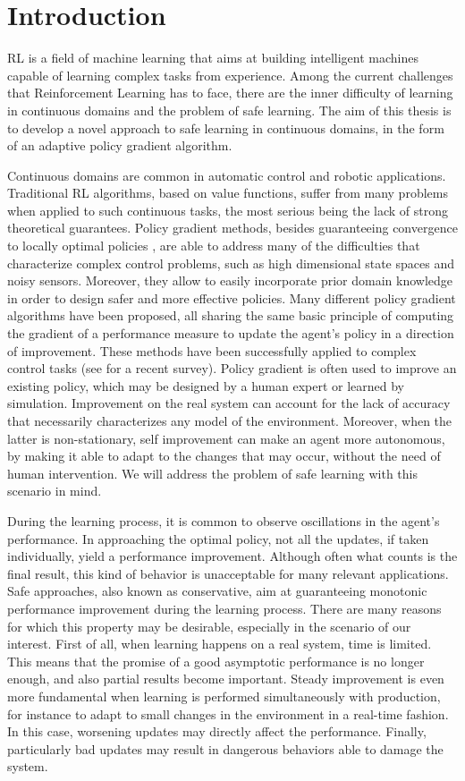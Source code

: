 \chapter{Introduction}\label{chap:intro}
\ac{RL} is a field of machine learning that aims at building intelligent machines capable of learning complex tasks from experience. Among the current challenges that Reinforcement Learning has to face, there are the inner difficulty of learning in continuous domains and the problem of safe learning. The aim of this thesis is to develop a novel approach to safe learning in continuous domains, in the form of an adaptive policy gradient algorithm.

Continuous domains are common in automatic control and robotic applications. Traditional \ac{RL} algorithms, based on value functions, suffer from many problems when applied to such continuous tasks, the most serious being the lack of strong theoretical guarantees.
Policy gradient methods, besides guaranteeing convergence to locally optimal policies \cite{Sutton1999a}, are able to address many of the difficulties that characterize complex control problems, such as high dimensional state spaces and noisy sensors. Moreover, they allow to easily incorporate prior domain knowledge in order to design safer and more effective policies.
Many different policy gradient algorithms have been proposed, all sharing the same basic principle of computing the gradient of a performance measure to update the agent's policy in a direction of improvement. These methods have been successfully applied to complex control tasks (see \cite{deisenroth2013survey} for a recent survey). 
Policy gradient is often used to improve an existing policy, which may be designed by a human expert or learned by simulation. Improvement on the real system can account for the lack of accuracy that necessarily characterizes any model of the environment. Moreover, when the latter is non-stationary, self improvement can make an agent more autonomous, by making it able to adapt to the changes that may occur, without the need of human intervention. We will address the problem of safe learning with this scenario in mind.

During the learning process, it is common to observe oscillations in the agent's performance. In approaching the optimal policy, not all the updates, if taken individually, yield a performance improvement. Although often what counts is the final result, this kind of behavior is unacceptable for many relevant applications. Safe approaches, also known as conservative, aim at guaranteeing monotonic performance improvement during the learning process. There are many reasons for which this property may be desirable, especially in the scenario of our interest. First of all, when learning happens on a real system, time is limited. This means that the promise of a good asymptotic performance is no longer enough, and also partial results become important. Steady improvement is even more fundamental when learning is performed simultaneously with production, for instance to adapt to small changes in the environment in a real-time fashion. In this case, worsening updates may directly affect the performance.
Finally, particularly bad updates may result in dangerous behaviors able to damage the system. 

